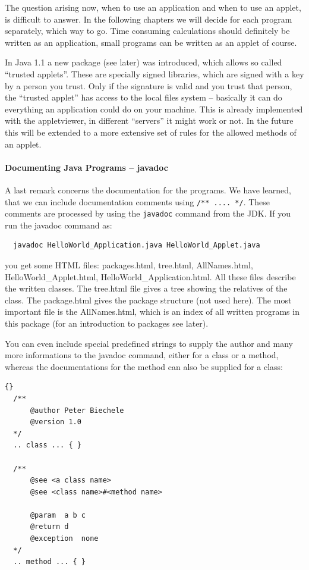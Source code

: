 The question arising now, when to use an application and when to use
an applet, is difficult to answer. In the following chapters we will 
decide for each program
separately, which way to go. Time consuming calculations should
definitely be written as an application, small programs can be
written as an applet of course.

In Java 1.1 a new package (see later) was introduced, which allows
so called ``trusted applets''. These are specially signed libraries,
which are signed with a key by a person you trust. Only if the
signature is valid and you trust that person, the ``trusted applet''
has access to the local files system -- basically it can do everything
an application could do on your machine. This is already implemented with
the appletviewer, in different ``servers'' it might work or not. In the
future this will be extended to a more extensive set of rules for the
allowed methods of an applet.

\paragraph{Documenting Java Programs -- javadoc}
A last remark concerns the documentation for the programs. We have
learned, that we can include documentation comments using 
\verb|/** .... */|. These comments are processed by using the
\verb|javadoc| command from the JDK. If you run the javadoc command as: 
\begin{verbatim}
  javadoc HelloWorld_Application.java HelloWorld_Applet.java  
\end{verbatim}
you get some HTML files: packages.html, tree.html, AllNames.html,
HelloWorld\_Applet.html, HelloWorld\_Application.html. All these
files describe the written classes. The tree.html file gives a tree
showing the relatives of the class. The package.html gives the
package structure (not used here). The most important file is the
AllNames.html, which is an index of all written programs in this package
(for an introduction to packages see later).

You can even include special predefined strings to supply the
author and many more informations to the javadoc command, either
for a class or a method, whereas the documentations for the method
can also be supplied for a class:
\begin{lstlisting}{}
  /**
      @author Peter Biechele
      @version 1.0
  */
  .. class ... { }

  /** 
      @see <a class name>
      @see <class name>#<method name>

      @param  a b c
      @return d
      @exception  none
  */
  .. method ... { }
\end{lstlisting}


